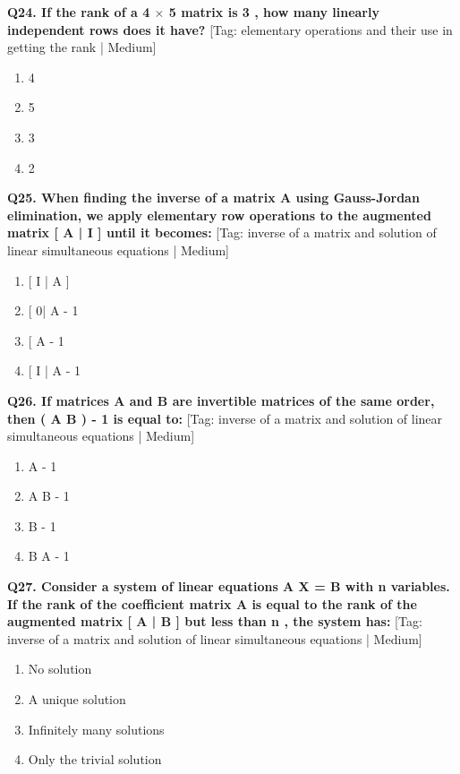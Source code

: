 \noindent\textbf{Q24. If the rank of a 4 $\times$ 5 matrix is 3 , how many linearly independent rows does it have?} \hfill [Tag: elementary operations and their use in getting the rank | Medium]
\begin{enumerate}[label=(\alph*),topsep=2pt,itemsep=1pt,partopsep=0pt,parsep=0pt]
    \item {{4}}
    \item {{5}}
    \item {{3}}
    \item {{2}}
\end{enumerate}
\vspace{2mm}

\noindent\textbf{Q25. When finding the inverse of a matrix A using Gauss-Jordan elimination, we apply elementary row operations to the augmented matrix [ A | I ] until it becomes:} \hfill [Tag: inverse of a matrix and solution of linear simultaneous equations | Medium]
\begin{enumerate}[label=(\alph*),topsep=2pt,itemsep=1pt,partopsep=0pt,parsep=0pt]
    \item {{[ I | A ]}}
    \item {{[ 0| A - 1}}
    \item {{[ A - 1}}
    \item {{[ I | A - 1}}
\end{enumerate}
\vspace{2mm}

\noindent\textbf{Q26. If matrices A and B are invertible matrices of the same order, then ( A B ) - 1 is equal to:} \hfill [Tag: inverse of a matrix and solution of linear simultaneous equations | Medium]
\begin{enumerate}[label=(\alph*),topsep=2pt,itemsep=1pt,partopsep=0pt,parsep=0pt]
    \item {{A - 1}}
    \item {{A B - 1}}
    \item {{B - 1}}
    \item {{B A - 1}}
\end{enumerate}
\vspace{2mm}

\noindent\textbf{Q27. Consider a system of linear equations A X = B with n variables. If the rank of the coefficient matrix A is equal to the rank of the augmented matrix [ A | B ] but less than n , the system has:} \hfill [Tag: inverse of a matrix and solution of linear simultaneous equations | Medium]
\begin{enumerate}[label=(\alph*),topsep=2pt,itemsep=1pt,partopsep=0pt,parsep=0pt]
    \item {{No solution}}
    \item {{A unique solution}}
    \item {{Infinitely many solutions}}
    \item {{Only the trivial solution}}
\end{enumerate}
\vspace{2mm}

